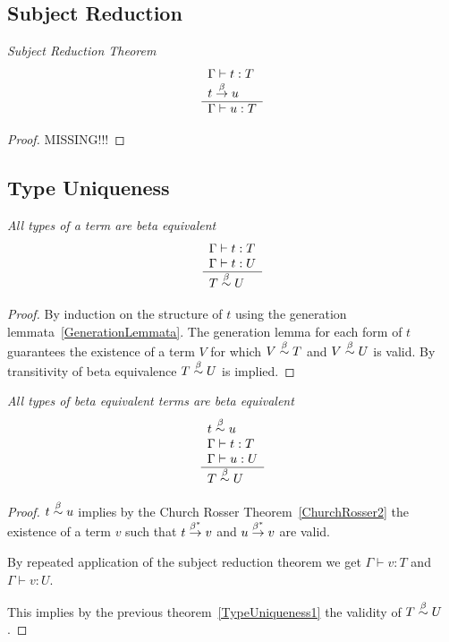 \subsection{Subject Reduction}


\begin{theorem}
    \label{SubjectReductionTheorem}
    \emph{Subject Reduction Theorem}
    $$
    \begin{array}{l} 
        \Gamma \vdash t : T
        \\
        t \stackrel{\beta}{\to} u
     \\ \hline 
        \Gamma \vdash u: T
    \end{array}
    $$

    \begin{proof}
        MISSING!!!
    \end{proof}
\end{theorem}





\subsection{Type Uniqueness}


\begin{theorem}
    \label{TypeUniqueness1}
    \emph{All types of a term are beta equivalent}
    $$
    \begin{array}{l} 
        \Gamma \vdash t : T
        \\
        \Gamma \vdash t : U
     \\ \hline 
        T \stackrel{\beta}{\sim} U
    \end{array}
    $$

    \begin{proof}
        By induction on the structure of $t$ using the generation
        lemmata~\ref{GenerationLemmata}. The generation lemma for each form of
        $t$ guarantees the existence of a term $V$ for which $V \stackrel{\beta}{\sim} T$ and
        $V \stackrel{\beta}{\sim} U$ is valid. By transitivity of beta equivalence $T \stackrel{\beta}{\sim}
        U$ is implied.
    \end{proof}
\end{theorem}



\begin{theorem}
    \label{TypeUniqueness2}
    \emph{All types of beta equivalent terms are beta equivalent}
    $$
    \begin{array}{l} 
        t \stackrel{\beta}{\sim} u
        \\
        \Gamma \vdash t : T
        \\
        \Gamma \vdash u : U
     \\ \hline 
        T \stackrel{\beta}{\sim} U
    \end{array}
    $$

    \begin{proof}
        $ t \stackrel{\beta}{\sim} u$ implies by the Church Rosser Theorem~\ref{ChurchRosser2}
        the existence of a term $v$ such that $t \stackrel{\beta^*}{\to} v$ and $u
        \stackrel{\beta^*}{\to} v$ are valid.

        By repeated application of the subject reduction theorem we get $\Gamma
        \vdash v : T$ and $\Gamma \vdash v : U$.

        This implies by the previous theorem~\ref{TypeUniqueness1} the validity
        of $T \stackrel{\beta}{\sim} U$.
    \end{proof}
\end{theorem}

